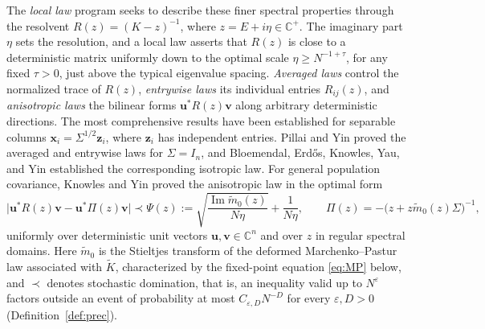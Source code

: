 \documentclass[11pt,reqno]{amsart}
\def\u{\mathbf{u}}
\def\bv{\mathbf{v}}
\def\x{\mathbf{x}}
\def\z{\mathbf{z}}
\def\C{\mathbb{C}}
\def\Im{\operatorname{Im}}
\def\eps{\varepsilon}
\theoremstyle{definition}
\numberwithin{equation}{section}
\numberwithin{figure}{section}
\begin{document}
The \emph{local law} program \cite{erdHos2009local,erdHos2017dynamical} seeks to describe these finer spectral properties through the resolvent $R(z)=(K-z)^{-1}$, where $z=E+i\eta\in\C^+$. The imaginary part $\eta$ sets the resolution, and a local law asserts that $R(z)$ is close to a deterministic matrix uniformly down to the optimal scale $\eta\ge N^{-1+\tau}$, for any fixed $\tau >0$, just above the typical eigenvalue spacing. \emph{Averaged laws} control the normalized trace of $R(z)$, \emph{entrywise laws} its individual entries $R_{ij} (z)$, and \emph{anisotropic laws} the bilinear forms $\u^*R(z)\bv$ along arbitrary deterministic directions. The most comprehensive results have been established for separable columns $\x_i=\Sigma^{1/2}\z_i$, where $\z_i$ has independent entries. Pillai and Yin \cite{pillai2014universality} proved the averaged and entrywise laws for $\Sigma=I_n$, and Bloemendal, Erd\H{o}s, Knowles, Yau, and Yin \cite{bloemendal2014isotropic} established the corresponding isotropic law. For general population covariance, Knowles and Yin \cite{knowles2017anisotropic} proved the anisotropic law in the optimal form
\begin{equation}\label{eq:intro-anisotropic-local-law}
 \big|\u^*R(z)\bv-\u^*\Pi(z)\bv\big|\prec\Psi(z):=\sqrt{\frac{\Im\widetilde m_0(z)}{N\eta}}+\frac1{N\eta},\qquad
 \Pi(z)=-\big(z+z\widetilde m_0(z)\Sigma\big)^{-1},
\end{equation}
uniformly over deterministic unit vectors $\u,\bv\in\C^n$ and over $z$ in regular spectral domains. Here $\widetilde m_0$ is the Stieltjes transform of the deformed Marchenko--Pastur law associated with $\widetilde K$, characterized by the fixed-point equation \eqref{eq:MP} below, and $\prec$ denotes stochastic domination, that is, an inequality valid up to $N^{\eps}$ factors outside an event of probability at most $C_{\eps,D}N^{-D}$ for every $\eps,D>0$ (Definition~\ref{def:prec}). 
\end{document}
